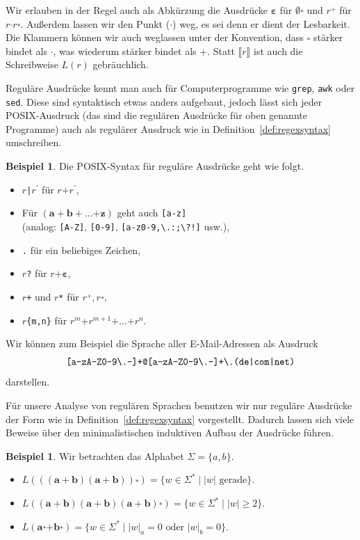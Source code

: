 \documentclass[11pt, a4paper]{article}
\theoremstyle{definition}
\newtheorem{example}[definition]{Beispiel}
\theoremstyle{plain}
\numberwithin{equation}{section}
\begin{document}
Wir erlauben in der Regel auch als Abkürzung die Ausdrücke \( \bm{\varepsilon} \) für \( \bm{\emptyset} \overset{\bm{\ast}}{} \) und \( r \overset{\bm{+}}{} \) für \( r \bm{\cdot} r \overset{\bm{\ast}}{} \). Außerdem lassen wir den Punkt (\( \bm{\cdot} \)) weg, es sei denn er dient der Lesbarkeit. Die Klammern können wir auch weglassen unter der Konvention, dass \( \overset{\bm{\ast}}{} \) stärker bindet als \( \bm{\cdot} \), was wiederum stärker bindet als \( \bm{+} \). Statt \( \llbracket r \rrbracket \) ist auch die Schreibweise \( L(r) \) gebräuchlich.\par
Reguläre Ausdrücke kennt man auch für Computerprogramme wie \texttt{grep}, \texttt{awk} oder \texttt{sed}. Diese sind syntaktisch etwas anders aufgebaut, jedoch lässt sich jeder POSIX-Ausdruck (das sind die regulären Ausdrücke für oben genannte Programme) auch als regulärer Ausdruck wie in Definition~\ref{def:regexsyntax} umschreiben.
\begin{example}
	Die POSIX-Syntax für reguläre Ausdrücke geht wie folgt.
	\begin{itemize}
		\item \( r \)\verb$|$\( r^\prime \) für \( r \bm{+} r^\prime \),
		\item Für \( (\bm{a + b +} \ldots \bm{+ z}) \) geht auch \verb$[a-z]$\\
			(analog: \verb$[A-Z]$,  \verb$[0-9]$, \verb$[a-z0-9,\.:;\?!]$ usw.),
		\item \verb$.$ für ein beliebiges Zeichen,
		\item \( r \)\verb$?$ für \( r \bm{+ \varepsilon} \),
		\item \( r \)\verb$+$ und \( r \)\verb$*$ für \( r\overset{\bm{+}}{}, r\overset{\bm{\ast}}{} \),
		\item \( r \)\verb${m,n}$ für \( r^m \bm{+} r^{m+1} \bm{+} \ldots \bm{+} r^n \).
	\end{itemize}
	Wir können zum Beispiel die Sprache aller E-Mail-Adressen als Ausdruck
	\[
		\verb$[a-zA-Z0-9\.-]+@[a-zA-Z0-9\.-]+\.(de|com|net)$
	\]
	darstellen.
\end{example}
Für unsere Analyse von regulären Sprachen benutzen wir nur reguläre Ausdrücke der Form wie in Definition~\ref{def:regexsyntax} vorgestellt. Dadurch lassen sich viele Beweise über den minimalistischen induktiven Aufbau der Ausdrücke führen.
\begin{example}
	Wir betrachten das Alphabet \( \Sigma = \{a, b\} \).
	\begin{itemize}
		\item \( L(\bm{((a+b)(a+b))} \overset{\bm{\ast}}{}) = \{ w \in \Sigma^\ast \mid \left| w \right| \text{ gerade} \} \).
		\item \( L(\bm{(a+b)(a+b)(a+b)} \overset{\bm{\ast}}{}) = \{ w \in \Sigma^\ast \mid \left| w \right| \geq 2 \} \).
		\item \( L(\bm{a} \overset{\bm{\ast}}{} \bm{+ b} \overset{\bm{\ast}}{}) = \{ w \in \Sigma^\ast \mid \left| w \right|_a = 0 \text{ oder } \left| w \right|_b = 0 \} \).
	\end{itemize}
\end{example}
\end{document}
